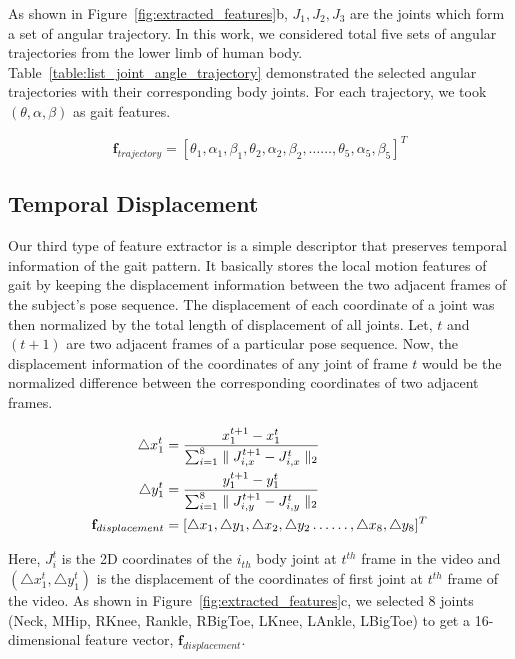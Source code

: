 As shown in Figure~\ref{fig:extracted_features}b, $J_1, J_2, J_3$ are the joints which form a set of angular trajectory. In this work, we considered total five sets of angular trajectories from the lower limb of human body. Table~\ref{table:list_joint_angle_trajectory} demonstrated the selected angular trajectories with their corresponding body joints. For each trajectory, we took $(\theta, \alpha, \beta)$ as gait features. 

\begin{equation}
\textbf {f}_{trajectory}= [\theta_1, \alpha_1, \beta_1,\theta_2, \alpha_2, \beta_2,\ldots\ldots, \theta_5, \alpha_5, \beta_5]^T
\end{equation}


\subsection{Temporal Displacement}
Our third type of feature extractor is a simple descriptor that preserves temporal information of the gait pattern. It basically stores the local motion features of gait by keeping the displacement information between the two adjacent frames of the subject's pose sequence. The displacement of each coordinate of a joint was then normalized by the total length of displacement of all joints. Let, $t$ and $(t + 1)$ are two adjacent frames of a particular pose sequence. Now, the displacement information of the coordinates of any joint of frame $t$ would be the normalized difference between the corresponding coordinates of two adjacent frames. 

\begin{equation}
\begin{split}
\triangle x^{t}_{1} &=\frac{x^{t+1}_{1} - x^{t}_{1}}{\sum_{i=1}^{8}\parallel J^{t+1}_{i,x} - J^{t}_{i,x}\parallel_2} \\ 
\triangle y^{t}_{1} &=\frac{y^{t+1}_{1} - y^{t}_{1}}{\sum_{i=1}^{8}\parallel J^{t+1}_{i,y} - J^{t}_{i,y}\parallel_2} \\ 
{\bf f}_{displacement} &= [\triangle x_{1}, \triangle y_{1}, \triangle x_{2}, \triangle y_{2} \ldots\ldots, \triangle x_{8}, \triangle y_{8}]^{T}
\end{split}
\end{equation}

Here, $J_i^{t}$ is the 2D coordinates of the $i_{th}$ body joint at $t^{th}$ frame in the video and $(\triangle x_1^t , \triangle y_1^t )$ is the displacement of the coordinates of first joint at $t^{th}$ frame of the video. As shown in Figure~\ref{fig:extracted_features}c, we selected 8 joints (Neck, MHip, RKnee, Rankle, RBigToe, LKnee, LAnkle, LBigToe) to get a 16-dimensional feature vector, $\textbf{f}_{displacement}$.


